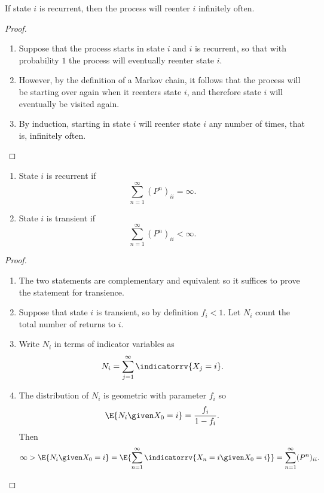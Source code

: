 \documentclass[12pt]{article}
\begin{document}
\begin{proposition}
    If state \( i \) is recurrent, then the process will reenter \( i \)
    infinitely often.
\end{proposition}

\begin{proof}
    \begin{enumerate}
        \item
            Suppose that the process starts in state \( i \) and \( i \)
            is recurrent, so that with probability \( 1 \) the process
            will eventually reenter state \( i \).
        \item
            However, by the definition of a Markov chain, it follows
            that the process will be starting over again when it
            reenters state \( i \), and therefore state \( i \) will
            eventually be visited again.
        \item
            By induction, starting in state \( i \) will reenter state \(
            i \) any number of times, that is, infinitely often.
    \end{enumerate}
\end{proof}

\begin{proposition}
    \begin{enumerate}
        \item
            State \( i \) is recurrent if
            \[
                \sum\limits_{n=1}^{\infty} (P^n)_{ii} = \infty.
            \]
        \item
            State \( i \) is transient if
            \[
                \sum\limits_{n=1}^{\infty} (P^n)_{ii} < \infty.
            \]
    \end{enumerate}
\end{proposition}

\begin{proof}
    \begin{enumerate}
        \item
            The two statements are complementary and equivalent so it
            suffices to prove the statement for transience.
        \item
            Suppose that state \( i \) is transient, so by definition \(
            f_i <1 \).  Let \( N_i \) count the total number of returns
            to \( i \).
        \item
            Write \( N_i \) in terms of indicator variables as
            \[
                N_i = \sum\limits_{j=1}^{\infty} \indicatorrv{X_j=i}.
            \]
        \item
            The distribution of \( N_i \) is geometric with parameter \(
            f_i \) so
            \[
                \E{N_i \given X_0 = i} = \frac{f_i}{1 - f_i}.
            \] Then
            \[
                \infty > \E{N_i \given X_0 = i} = \E{ \sum\limits_{n=1}^
                {\infty} \indicatorrv{X_n=i \given X_0=i}} = \sum\limits_
                {n=1}^{\infty} (P^n)_{ii}.
            \]
    \end{enumerate}
\end{proof}
\end{document}
